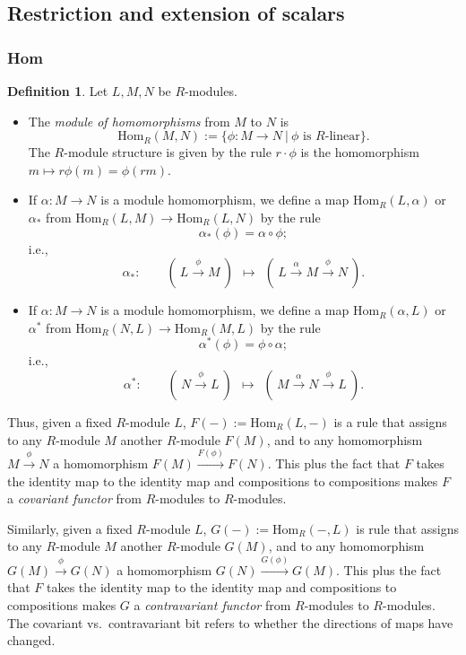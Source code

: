 \documentclass{amsart}[12pt]
\newcommand{\Hom}{\mathrm{Hom}}
\numberwithin{equation}{section}
\theoremstyle{plain} %
\theoremstyle{definition}
\newtheorem{defn}[equation]{Definition}
\theoremstyle{remark}
\newcommand{\ssec}[1]{\subsection{#1}}
\newcommand{\sssec}[1]{\subsubsection{#1}}
\begin{document}
\ssec{Restriction and extension of scalars}

\sssec{Hom}


\begin{defn} Let $L,M,N$ be $R$-modules.
	\begin{itemize}
		\item The \emph{module of homomorphisms}\index{$\Hom_R(M,N)$} from $M$ to $N$ is 
		\[ \Hom_R(M,N) := \{ \phi:M \to N \ | \ \phi\text{ is $R$-linear}\}.\]
		The $R$-module structure is given by the rule $r \cdot \phi$ is the homomorphism $m \mapsto r \phi(m) = \phi(rm)$.
		\item If $\alpha: M\to N$ is a module homomorphism, we define a map $\Hom_R(L,\alpha)$ or $\alpha_*$\index{$\Hom_R(L,\alpha)$}\index{$\alpha_*$} from $\Hom_R(L,M)\to \Hom_R(L,N)$ by the rule
		\[ \alpha_*{(\phi)} =  \alpha \circ \phi ;\]
		i.e.,
		\[ \alpha_* : \qquad (\ L\xrightarrow{\phi} M \ ) \ \ \mapsto \ \ (\ L \xrightarrow{\alpha }M\xrightarrow{\phi} N \ ).   \]
			\item If $\alpha: M\to N$ is a module homomorphism, we define a map $\Hom_R(\alpha,L)$ or $\alpha^*$\index{$\Hom_R(\alpha,L)$}\index{$\alpha^*$} from $\Hom_R(N,L)\to \Hom_R(M,L)$ by the rule
		\[ \alpha^*{(\phi)} = \phi \circ \alpha;\]
		i.e.,
		\[ \alpha^* : \qquad (\ N\xrightarrow{\phi} L \ ) \ \ \mapsto \ \ (\ M \xrightarrow{\alpha }N\xrightarrow{\phi} L \ ).   \]
	\end{itemize}
\end{defn}

Thus, given a fixed $R$-module $L$, $F(-):=\Hom_R(L,-)$ is a rule that assigns to any $R$-module $M$ another $R$-module $F(M)$, and to any homomorphism $M \xrightarrow{\phi} N$ a homomorphism $F(M) \xrightarrow{F(\phi)} F(N)$. This plus the fact that $F$ takes the identity map to the identity map and compositions to compositions makes $F$ a \emph{covariant functor} from $R$-modules to $R$-modules.

Similarly, given a fixed $R$-module $L$, $G(-):= \Hom_R(-,L)$ is rule that assigns to any $R$-module $M$ another $R$-module $G(M)$, and to any homomorphism $G(M) \xrightarrow{\phi} G(N)$ a homomorphism $G(N) \xrightarrow{G(\phi)} G(M)$. This plus the fact that $F$ takes the identity map to the identity map and compositions to compositions makes $G$ a \emph{contravariant functor} from $R$-modules to $R$-modules. The covariant vs.~contravariant bit refers to whether the directions of maps have changed.
\end{document}
